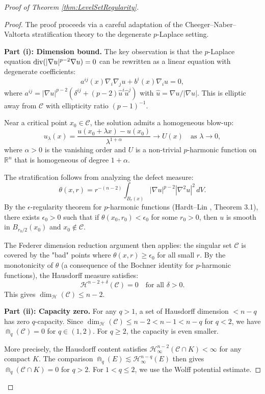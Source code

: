 \begin{proof}[Proof of Theorem \ref{thm:LevelSetRegularity}]
\begin{proof}
The proof proceeds via a careful adaptation of the Cheeger--Naber--Valtorta stratification theory to the degenerate $p$-Laplace setting.

\textbf{Part (i): Dimension bound.}
The key observation is that the $p$-Laplace equation $\mathrm{div}(|\nabla u|^{p-2} \nabla u) = 0$ can be rewritten as a linear equation with degenerate coefficients:
\[
    a^{ij}(x) \nabla_i \nabla_j u + b^i(x) \nabla_i u = 0,
\]
where $a^{ij} = |\nabla u|^{p-2}(\delta^{ij} + (p-2)\hat{u}^i \hat{u}^j)$ with $\hat{u} = \nabla u / |\nabla u|$. This is elliptic away from $\mathcal{C}$ with ellipticity ratio $(p-1)^{-1}$.

Near a critical point $x_0 \in \mathcal{C}$, the solution admits a homogeneous blow-up:
\[
    u_\lambda(x) = \frac{u(x_0 + \lambda x) - u(x_0)}{\lambda^{1+\alpha}} \to U(x) \quad \text{as } \lambda \to 0,
\]
where $\alpha > 0$ is the vanishing order and $U$ is a non-trivial $p$-harmonic function on $\mathbb{R}^n$ that is homogeneous of degree $1+\alpha$. 

The stratification follows from analyzing the defect measure:
\[
    \theta(x, r) = r^{-(n-2)} \int_{B_r(x)} |\nabla u|^{p-2} |\nabla^2 u|^2 \, dV.
\]
By the $\epsilon$-regularity theorem for $p$-harmonic functions (Hardt--Lin \cite{hardtlin1987}, Theorem 3.1), there exists $\epsilon_0 > 0$ such that if $\theta(x_0, r_0) < \epsilon_0$ for some $r_0 > 0$, then $u$ is smooth in $B_{r_0/2}(x_0)$ and $x_0 \notin \mathcal{C}$.

The Federer dimension reduction argument then applies: the singular set $\mathcal{C}$ is covered by the "bad" points where $\theta(x, r) \ge \epsilon_0$ for all small $r$. By the monotonicity of $\theta$ (a consequence of the Bochner identity for $p$-harmonic functions), the Hausdorff measure satisfies:
\[
    \mathcal{H}^{n-2+\delta}(\mathcal{C}) = 0 \quad \text{for all } \delta > 0.
\]
This gives $\dim_{\mathcal{H}}(\mathcal{C}) \le n - 2$.

\textbf{Part (ii): Capacity zero.}
For any $q > 1$, a set of Hausdorff dimension $< n - q$ has zero $q$-capacity. Since $\dim_{\mathcal{H}}(\mathcal{C}) \le n-2 < n-1 < n-q$ for $q < 2$, we have $\Cap_q(\mathcal{C}) = 0$ for $q \in (1, 2)$. For $q \ge 2$, the capacity is even smaller.

More precisely, the Hausdorff content satisfies $\mathcal{H}^{n-2}_\infty(\mathcal{C} \cap K) < \infty$ for any compact $K$. The comparison $\Cap_q(E) \lesssim \mathcal{H}^{n-q}_\infty(E)$ then gives $\Cap_q(\mathcal{C} \cap K) = 0$ for $q > 2$. For $1 < q \le 2$, we use the Wolff potential estimate.


\end{proof}
\end{proof}
